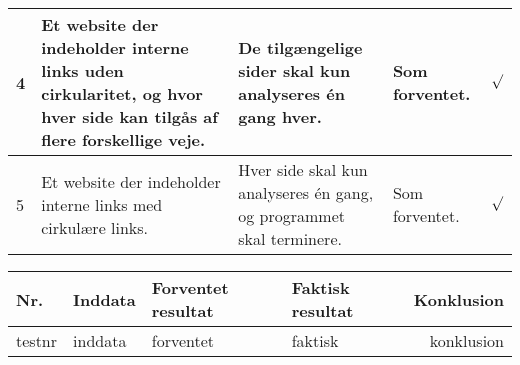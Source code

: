 \documentclass[a4paper,oneside,article]{memoir}
\begin{document}
\begin{landscape}
\begin{longtable}[c]{p{20pt}|p{220pt}|p{130pt}|p{130pt}|r}
4 &
Et website der indeholder interne links uden cirkularitet, og hvor
hver side kan tilgås af flere forskellige veje. &
De tilgængelige sider skal kun analyseres én gang hver. &
Som forventet. &
$\surd$ \\ \hline

5 &
Et website der indeholder interne links med cirkulære links. &
Hver side skal kun analyseres én gang, og programmet skal
terminere. &
Som forventet. &
$\surd$

\end{longtable}

\begin{longtable}[c]{p{20pt}|p{220pt}|p{130pt}|p{130pt}|r}
\textbf{Nr.} &
\textbf{Inddata} &
\textbf{Forventet resultat} &
\textbf{Faktisk resultat} &
\textbf{Konklusion} \\ \hline

testnr &
inddata &
forventet &
faktisk &
konklusion \\ \hline
\end{longtable}

\end{landscape}
\end{document}

